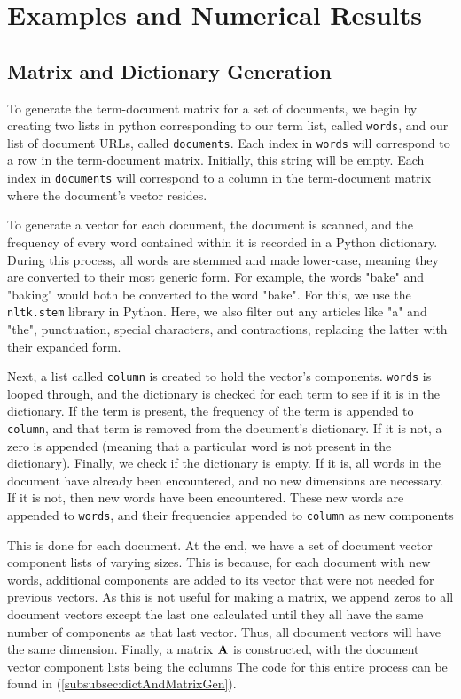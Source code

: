 \section{Examples and Numerical Results}\label{sec:ExamplesAndNumeric}

\subsection{Matrix and Dictionary Generation}\label{subsec:dictionaryGen}

To generate the term-document matrix for a set of documents, we begin by creating two lists in python corresponding to our term list, called \verb|words|, and our list of document URLs, called \verb|documents|. Each index in \verb|words| will correspond to a row in the term-document matrix. Initially, this string will be empty. Each index in \verb|documents| will correspond to a column in the term-document matrix where the document's vector resides.

To generate a vector for each document, the document is scanned, and the frequency of every word contained within it is recorded in a Python dictionary. During this process, all words are stemmed and made lower-case, meaning they are converted to their most generic form. For example, the words "bake" and "baking" would both be converted to the word "bake". For this, we use the \verb|nltk.stem| library in Python. Here, we also filter out any articles like "a" and "the", punctuation, special characters, and contractions, replacing the latter with their expanded form.

Next, a list called \verb|column| is created to hold the vector's components. \verb|words| is looped through, and the dictionary is checked for each term to see if it is in the dictionary. If the term is present, the frequency of the term is appended to \verb|column|, and that term is removed from the document's dictionary. If it is not, a zero is appended (meaning that a particular word is not present in the dictionary). Finally, we check if the dictionary is empty. If it is, all words in the document have already been encountered, and no new dimensions are necessary. If it is not, then new words have been encountered. These new words are appended to \verb|words|, and their frequencies appended to \verb|column| as new components 

This is done for each document. At the end, we have a set of document vector component lists of varying sizes. This is because, for each document with new words, additional components are added to its vector that were not needed for previous vectors. As this is not useful for making a matrix, we append zeros to all document vectors except the last one calculated until they all have the same number of components as that last vector. Thus, all document vectors will have the same dimension. Finally, a matrix \(\operatorname{\mathbf{A}}\) is constructed, with the document vector component lists being the columns  The code for this entire process can be found in (\autoref{subsubsec:dictAndMatrixGen}).

